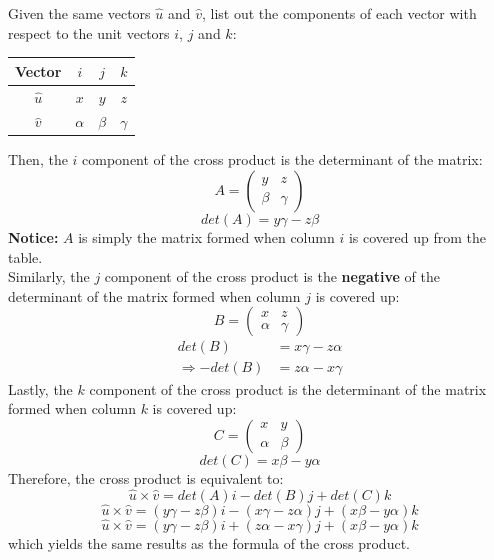 \documentclass[hidelinks, a4paper, 12pt]{article}
\newcommand{\bd}{\textbf}
\newcommand{\thus}{\Rightarrow}
\newcommand{\n}{\\[\baselineskip]}
\begin{document}
                Given the same vectors $\hat{u}$ and $\hat{v}$, list out the components of each vector with respect to the unit vectors $i$, $j$ and $k$:
                \begin{center}
                    \begin{tabular}{|c || c | c | c|} 
                    \hline
                    Vector & $i$ & $j$ & $k$ \\
                    \hline
                    $\hat{u}$ & $x$ & $y$ & $z$ \\ 
                    \hline
                    $\hat{v}$ & $\alpha$ & $\beta$ & $\gamma$ \\
                    \hline
                   \end{tabular}
                \end{center}
                Then, the $i$ component of the cross product is the determinant of the matrix:
                \[A = \begin{pmatrix} y & z \\ \beta & \gamma \end{pmatrix}\]
                \[det(A) = y\gamma - z\beta\]
                \bd{Notice: } $A$ is simply the matrix formed when column $i$ is covered up from the table.\n
                Similarly, the $j$ component of the cross product is the \bd{negative} of the determinant of the matrix formed when column $j$ is covered up:
                \[B = \begin{pmatrix} x & z \\ \alpha & \gamma \end{pmatrix}\]
                \[\begin{split}
                    det(B) &= x\gamma - z\alpha\\
                    \thus -det(B) &= z\alpha - x\gamma
                \end{split}\]
                Lastly, the $k$ component of the cross product is the determinant of the matrix formed when column $k$ is covered up:
                \[C = \begin{pmatrix} x & y \\ \alpha & \beta \end{pmatrix}\]
                \[det(C) = x\beta - y\alpha\]
                Therefore, the cross product is equivalent to:
                \[\hat{u}\times\hat{v} = det(A)i - det(B)j + det(C)k\]
                \[\hat{u}\times\hat{v} = (y\gamma - z\beta)i - (x\gamma - z\alpha)j + (x\beta - y\alpha)k\]
                \[\hat{u}\times\hat{v} = (y\gamma - z\beta)i + (z\alpha - x\gamma)j + (x\beta - y\alpha)k\]
                which yields the same results as the formula of the cross product.
        
\end{document}

